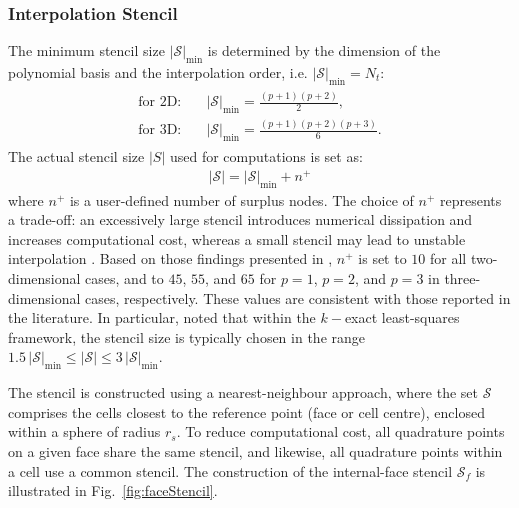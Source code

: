 \documentclass[sn-mathphys,Numbered]{sn-jnl}%
\begin{document}
\subsubsection{Interpolation Stencil}
\label{sec:stencil}
%
The minimum stencil size $|\mathcal{S}|_{\text{min}}$ is determined by the dimension of the polynomial basis and the interpolation order, i.e. $|\mathcal{S}|_{\text{min}} = N_t$:
\begin{eqnarray}
\begin{split}
\text{for 2D:}\quad & |\mathcal{S}|_{\text{min}} = \frac{(p+1)(p+2)}{2}, \\
\text{for 3D:}\quad & |\mathcal{S}|_{\text{min}} =\frac{(p+1)(p+2)(p+3)}{6}.
\end{split}
\end{eqnarray}
%
The actual stencil size $|S|$ used for computations is set as:
%
\begin{eqnarray}
|\mathcal{S}| = |\mathcal{S}|_{\text{min}} + n^+
\end{eqnarray}
where $n^{+}$ is a user-defined number of surplus nodes. The choice of $n^{+}$ represents a trade-off: an excessively large stencil introduces numerical dissipation and increases computational cost, whereas a small stencil may lead to unstable interpolation \cite{Khelladi2011}.
Based on those findings presented in \cite{Castrillo2022,Castrillo2024}, $n^{+}$ is set to $10$ for all two-dimensional cases, and to $45$, $55$, and $65$ for $p = 1$, $p = 2$, and $p = 3$ in three-dimensional cases, respectively. These values are consistent with those reported in the literature. In particular, \cite{Tsoutsanis2023} noted that within the $k-$exact least-squares framework, the stencil size is typically chosen in the range $1.5\,|\mathcal{S}|_{\text{min}} \leq |\mathcal{S}| \leq 3\,|\mathcal{S}|_{\text{min}}$.

The stencil is constructed using a nearest-neighbour approach, where the set $\mathcal{S}$ comprises the cells closest to the reference point (face or cell centre), enclosed within a sphere of radius $r_s$. To reduce computational cost, all quadrature points on a given face share the same stencil, and likewise, all quadrature points within a cell use a common stencil. The construction of the internal-face stencil $\mathcal{S}_f$ is illustrated in Fig.~\ref{fig:faceStencil}.
\end{document}
